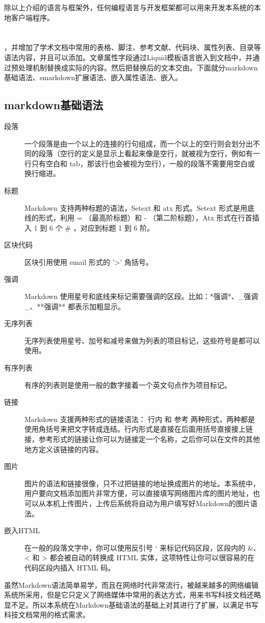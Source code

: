 除以上介绍的语言与框架外，任何编程语言与开发框架都可以用来开发本系统的本地客户端程序。

\section{}
\label{sec:smarkdownsyntax}

，并增加了学术文档中常用的表格、脚注、参考文献、代码块、属性列表、目录等语法内容，并且可以添加。文章属性字段通过Liquid模板语言嵌入到文档中，并通过预处理机制替换成实际的内容。然后把替换后的文本交由。下面就分markdown基础语法、smarkdown扩展语法、嵌入属性语法、嵌入。

\subsection{markdown基础语法}
\label{sec:markdownbase}

\begin{description}
\item[段落] 一个段落是由一个以上的连接的行句组成，而一个以上的空行则会划分出不同的段落（空行的定义是显示上看起来像是空行，就被视为空行，例如有一行只有空白和 tab，那该行也会被视为空行），一般的段落不需要用空白或换行缩进。
\item[标题] Markdown 支持两种标题的语法，Setext 和 atx 形式。Setext 形式是用底线的形式，利用 = （最高阶标题）和 - （第二阶标题），Atx 形式在行首插入 1 到 6 个 \# ，对应到标题 1 到 6 阶。
\item[区块代码] 区块引用使用 email 形式的 '>' 角括号。
\item[强调] Markdown 使用星号和底线来标记需要强调的区段。比如：*强调*、\_强调\_、**强调** 都表示加粗显示。
\item[无序列表] 无序列表使用星号、加号和减号来做为列表的项目标记，这些符号是都可以使用。
\item[有序列表] 有序的列表则是使用一般的数字接着一个英文句点作为项目标记。
\item[链接] Markdown 支援两种形式的链接语法： 行内 和 参考 两种形式，两种都是使用角括号来把文字转成连结。行内形式是直接在后面用括号直接接上链接，参考形式的链接让你可以为链接定一个名称，之后你可以在文件的其他地方定义该链接的内容。
\item[图片] 图片的语法和链接很像，只不过把链接的地址换成图片的地址。本系统中，用户要向文档添加图片非常方便，可以直接填写网络图片库的图片地址，也可以从本机上传图片，上传后系统将自动为用户填写好Markdown的图片语法。
\item[嵌入HTML] 在一般的段落文字中，你可以使用反引号 ` 来标记代码区段，区段内的 \&、< 和 > 都会被自动的转换成 HTML 实体，这项特性让你可以很容易的在代码区段内插入 HTML 码。
\end{description}
虽然Markdown语法简单易学，而且在网络时代非常流行，被越来越多的网络编辑系统所采用，但是它只定义了网络媒体中常用的表达方式，用来书写科技文档还略显不足。所以本系统在Markdown基础语法的基础上对其进行了扩展，以满足书写科技文档常用的格式需求。

